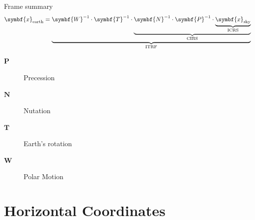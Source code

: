 \documentclass[aspectratio=1610, 9pt]{beamer}
\begin{document}
\begin{frame}[c]{Frame summary}
  \Huge
  \begin{equation*}
    \symbf{x}_\text{earth} = \underbrace{
      \symbf{W}^{-1} \cdot \symbf{T}^{-1} \cdot \underbrace{
        \symbf{N}^{-1} \cdot \symbf{P}^{-1} \cdot \underbrace{
          \symbf{x}_\text{sky}
        }_\text{ICRS}}_{\mathclap{\text{CIRS}}}}_\text{ITRF}
  \end{equation*}

  \large
  \begin{description}
    \item[$\symbf{P}$] Precession
    \item[$\symbf{N}$] Nutation
    \item[$\symbf{T}$] Earth's rotation
    \item[$\symbf{W}$] Polar Motion
  \end{description}
\end{frame}

\section{Horizontal Coordinates}
\end{document}
